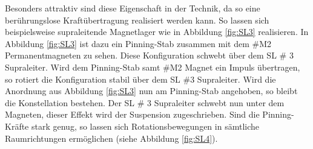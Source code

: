 \noindent
Besonders attraktiv sind diese Eigenschaft in der Technik,
da so eine berührungslose Kraftübertragung realisiert werden kann. So lassen sich
beispielsweise supraleitende Magnetlager wie in Abbildung \ref{fig:SL3} realisieren.
In Abbildung \ref{fig:SL3} ist dazu ein Pinning-Stab zusammen mit dem \#M2
Permanentmagneten zu sehen. Diese Konfiguration schwebt über dem SL \# 3 Supraleiter.
Wird dem Pinning-Stab samt \#M2 Magnet ein Impuls übertragen, so rotiert die Konfiguration
stabil über dem SL \#3 Supraleiter. Wird die Anordnung aus Abbildung \ref{fig:SL3} nun
am Pinning-Stab angehoben, so bleibt die Konstellation bestehen. Der SL \# 3 Supraleiter
schwebt nun unter dem Magneten, dieser Effekt wird der Suspension zugeschrieben.
Sind die Pinning-Kräfte stark genug, so lassen sich Rotationsbewegungen in
sämtliche Raumrichtungen ermöglichen (siehe Abbildung \ref{fig:SL4}).

